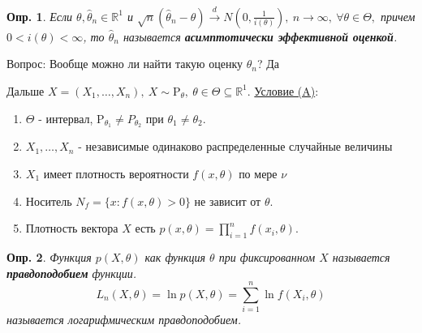 \documentclass[12pt]{article}
\newtheorem{definition}{Опр.}
\theoremstyle{basic_theorem}
\theoremstyle{name_theorem}
\newcommand\defin[1]{\textbf{#1}}
\def\R{ \mathbb{R} }
\def\P{ \mathrm{P} }
\begin{document}
    \begin{definition}
        Если \(\theta, \widehat{\theta}_n \in \R^1\) и $\sqrt{n}(\widehat{\theta}_n - \theta)\xrightarrow{d} N(0, \frac{1}{i(\theta)}),
        \ n \rightarrow \infty, \ \forall \theta \in \Theta,$
        причем \(0 < i(\theta) < \infty\), то \(\widehat{\theta}_n\) называется \defin{асимптотически
        эффективной оценкой}.
    \end{definition}
    Вопрос: Вообще можно ли найти такую оценку \(\widehat{\theta}_n\)? Да

    \newpage

    Дальше \(X = (X_1, \ldots, X_n), \ X \sim \P_\theta,\ \theta \in \Theta \subseteq \R^1\).
    \underline{Условие (A)}:
    \begin{enumerate}
        \item \(\Theta\) - интервал, \(\P_{\theta_1} \neq P_{\theta_2}\) при \(\theta_1 \neq \theta_2\).
        \item \(X_1, \ldots, X_n\) - независимые одинаково распределенные случайные величины
        \item \(X_1\) имеет плотность вероятности \(f(x, \theta)\) по мере \(\nu\)
        \item Носитель \(N_f = \{x: f(x, \theta) > 0\}\) не зависит от \(\theta\).
        \item Плотность вектора \(X\) есть \(p(x, \theta) = \prod_{i=1}^n f(x_i, \theta)\).
    \end{enumerate}
    \begin{definition}
    Функция \(p(X, \theta)\) как функция \(\theta\) при фиксированном \(X\) называется
    \defin{правдоподобием} функции.
    \[L_n(X, \theta) = \ln p(X, \theta) = \sum_{i=1}^n \ln f(X_i, \theta)\]
    называется логарифмическим правдоподобием.
    \end{definition}
\end{document}
